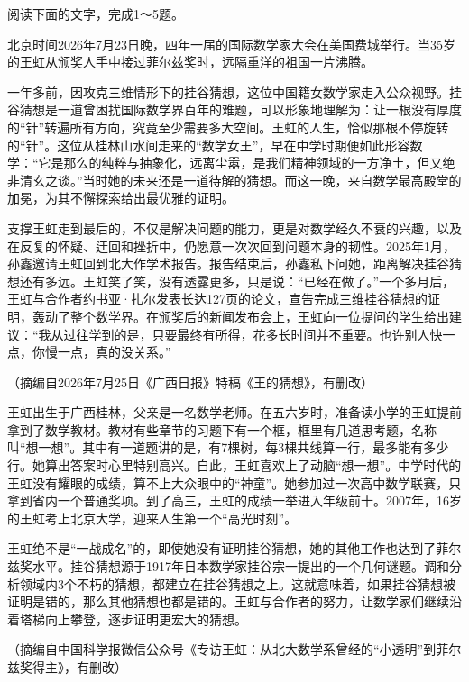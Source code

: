 \documentclass[11pt,a4paper]{ctexart}
\begin{document}


阅读下面的文字，完成1～5题。

\begin{materialtext}
北京时间2026年7月23日晚，四年一届的国际数学家大会在美国费城举行。当35岁的王虹从颁奖人手中接过菲尔兹奖时，远隔重洋的祖国一片沸腾。

一年多前，因攻克三维情形下的挂谷猜想，这位中国籍女数学家走入公众视野。挂谷猜想是一道曾困扰国际数学界百年的难题，可以形象地理解为：让一根没有厚度的“针”转遍所有方向，究竟至少需要多大空间。王虹的人生，恰似那根不停旋转的“针”。这位从桂林山水间走来的“数学女王”，早在中学时期便如此形容数学：“它是那么的纯粹与抽象化，远离尘嚣，是我们精神领域的一方净土，但又绝非清玄之谈。”当时她的未来还是一道待解的猜想。而这一晚，来自数学最高殿堂的加冕，为其不懈探索给出最优雅的证明。

支撑王虹走到最后的，不仅是解决问题的能力，更是对数学经久不衰的兴趣，以及在反复的怀疑、迂回和挫折中，仍愿意一次次回到问题本身的韧性。2025年1月，孙鑫邀请王虹回到北大作学术报告。报告结束后，孙鑫私下问她，距离解决挂谷猜想还有多远。王虹笑了笑，没有透露更多，只是说：“已经在做了。”一个多月后，王虹与合作者约书亚·扎尔发表长达127页的论文，宣告完成三维挂谷猜想的证明，轰动了整个数学界。在颁奖后的新闻发布会上，王虹向一位提问的学生给出建议：“我从过往学到的是，只要最终有所得，花多长时间并不重要。也许别人快一点，你慢一点，真的没关系。”
\end{materialtext}
\begin{flushright}（摘编自2026年7月25日《广西日报》特稿《王的猜想》，有删改）\end{flushright}

\begin{materialtext}
王虹出生于广西桂林，父亲是一名数学老师。在五六岁时，准备读小学的王虹提前拿到了数学教材。教材有些章节的习题下有一个框，框里有几道思考题，名称叫“想一想”。其中有一道题讲的是，有7棵树，每3棵共线算一行，最多能有多少行。她算出答案时心里特别高兴。自此，王虹喜欢上了动脑“想一想”。中学时代的王虹没有耀眼的成绩，算不上大众眼中的“神童”。她参加过一次高中数学联赛，只拿到省内一个普通奖项。到了高三，王虹的成绩一举进入年级前十。2007年，16岁的王虹考上北京大学，迎来人生第一个“高光时刻”。

王虹绝不是“一战成名”的，即使她没有证明挂谷猜想，她的其他工作也达到了菲尔兹奖水平。挂谷猜想源于1917年日本数学家挂谷宗一提出的一个几何谜题。调和分析领域内3个不朽的猜想，都建立在挂谷猜想之上。这就意味着，如果挂谷猜想被证明是错的，那么其他猜想也都是错的。王虹与合作者的努力，让数学家们继续沿着塔梯向上攀登，逐步证明更宏大的猜想。
\end{materialtext}
\begin{flushright}（摘编自中国科学报微信公众号《专访王虹：从北大数学系曾经的“小透明”到菲尔兹奖得主》，有删改）\end{flushright}
\end{document}
